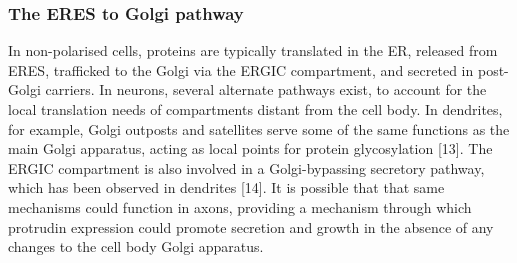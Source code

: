 \documentclass[
  12pt,
  a4paper,
]{article}
\begin{document}
\hypertarget{the-eres-to-golgi-pathway}{%
\subsubsection{The ERES to Golgi
pathway}\label{the-eres-to-golgi-pathway}}

In non-polarised cells, proteins are typically translated in the ER,
released from ERES, trafficked to the Golgi via the ERGIC compartment,
and secreted in post-Golgi carriers. In neurons, several alternate
pathways exist, to account for the local translation needs of
compartments distant from the cell body. In dendrites, for example,
Golgi outposts and satellites serve some of the same functions as the
main Golgi apparatus, acting as local points for protein glycosylation
{[}13{]}. The ERGIC compartment is also involved in a Golgi-bypassing
secretory pathway, which has been observed in dendrites {[}14{]}. It is
possible that that same mechanisms could function in axons, providing a
mechanism through which protrudin expression could promote secretion and
growth in the absence of any changes to the cell body Golgi apparatus.
\end{document}
